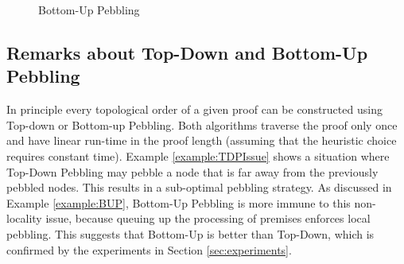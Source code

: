 \begin{example}
\begin{figure}[tb]
{\begin{minipage}{0.4\textwidth}
		\end{minipage}%
			}
		\caption{Bottom-Up Pebbling}
		\label{fig:BUP}
\end{figure}
\label{example:BUP}
\end{example}



\subsection{Remarks about Top-Down and Bottom-Up Pebbling} %
\label{sec:TDvsBU}

In principle every topological order of a given proof can be constructed using Top-down or Bottom-up Pebbling. Both algorithms traverse the proof only once and have linear run-time in the proof length (assuming that the heuristic choice requires constant time). Example \ref{example:TDPIssue} shows a situation where Top-Down Pebbling may pebble a node that is far away from the previously pebbled nodes. This results in a sub-optimal pebbling strategy.
As discussed in Example \ref{example:BUP}, Bottom-Up Pebbling is more immune to this non-locality issue, because queuing up the processing of premises enforces local pebbling. This suggests that Bottom-Up is better than Top-Down, which is confirmed by the experiments in Section \ref{sec:experiments}.

